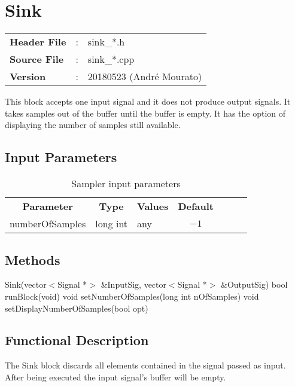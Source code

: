 \clearpage

\section{Sink}

\begin{tcolorbox}	
	\begin{tabular}{p{2.75cm} p{0.2cm} p{10.5cm}} 	
		\textbf{Header File}   &:& sink\_*.h \\
		\textbf{Source File}   &:& sink\_*.cpp \\
        \textbf{Version}       &:& 20180523 (Andr\'e Mourato)
	\end{tabular}
\end{tcolorbox}

This block accepts one input signal and it does not produce output signals. It takes samples out of the buffer until the buffer is empty. It has the option of displaying the number of samples still available.

\subsection*{Input Parameters}

\begin{table}[h]
	\centering
	\begin{tabular}{|c|c|p{30mm}|c|ccp{60mm}}
		\cline{1-4}
		\textbf{Parameter} & \textbf{Type} & \textbf{Values} &   \textbf{Default}& \\ \cline{1-4}
		numberOfSamples & long int & any & $-1$ \\ \cline{1-4}
	\end{tabular}
	\caption{Sampler input parameters}
	\label{table:sink_in_par}
\end{table}

\subsection*{Methods}

Sink(vector$<$Signal *$>$ \&InputSig, vector$<$Signal *$>$ \&OutputSig)
\bigbreak
bool runBlock(void)
\bigbreak
void setNumberOfSamples(long int nOfSamples)
\bigbreak
void setDisplayNumberOfSamples(bool opt)

\subsection*{Functional Description}

The Sink block discards all elements contained in the signal passed as input. After being executed the input signal's buffer will be empty.
